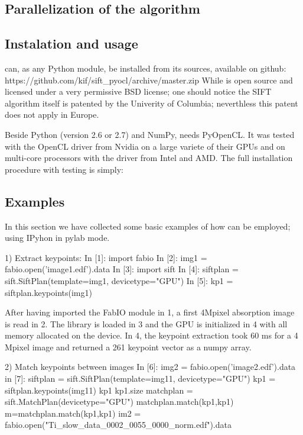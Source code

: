 \documentclass[preprint]{iucr}
\begin{document}
\subsection{Parallelization of the algorithm}

\subsection{Instalation and usage}
 can, as any Python module, be installed from its sources,
available on github:
https://github.com/kif/sift_pyocl/archive/master.zip 
While  is open source and licensed under a very
permissive BSD license; one should notice the SIFT algorithm itself is
patented by the Univerity of Columbia\cite{SIFT}; neverthless this patent does
not apply in Europe.

Beside Python (version 2.6 or 2.7) and NumPy,  needs
PyOpenCL\cite{pyopencl}.
It was tested with the OpenCL\cite{opencl} driver from Nvidia on a
large variete of their GPUs and on multi-core processors with the driver from
Intel and AMD. The full installation procedure with testing is simply:


\subsection{Examples}

In this section we have collected some basic examples of how
 can be employed; using IPyhon\cite{ipython} in
pylab\cite{matplotlib} mode.

1) Extract keypoints:
In [1]: import fabio 
In [2]: img1 = fabio.open('image1.edf').data
In [3]: import sift
In [4]: siftplan = sift.SiftPlan(template=img1, devicetype="GPU")
In [5]: kp1 = siftplan.keypoints(img1)

After having imported the FabIO\cite{fabio} module in 1, a first
4Mpixel absorption image is read in 2. The library is loaded in 3 and the GPU is
initialized in 4 with all memory allocated on the device. 
In 4, the keypoint extraction took 60 ms for a
4 Mpixel image and returned a 261 keypoint vector as a numpy array.

2) Match keypoints between images
In [6]: img2 = fabio.open('image2.edf').data
in [7]: 
siftplan = sift.SiftPlan(template=img11, devicetype="GPU")
kp1 = siftplan.keypoints(img11)
kp1
kp1.size
matchplan = sift.MatchPlan(devicetype="GPU")
matchplan.match(kp1,kp1)
m=matchplan.match(kp1,kp1)
im2 = fabio.open("Ti_slow_data_0002_0055_0000_norm.edf").data
\end{document}
